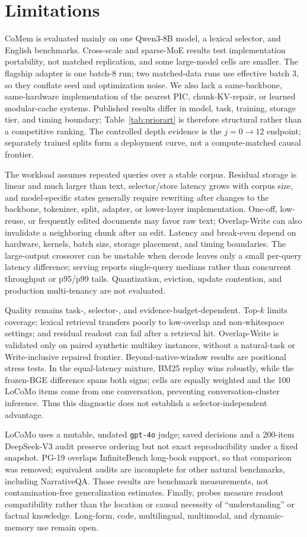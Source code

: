 \section*{Limitations}

CoMem is evaluated mainly on one Qwen3-8B model, a lexical selector, and English
benchmarks. Cross-scale and sparse-MoE results test implementation portability,
not matched replication, and some large-model cells are smaller. The flagship
adapter is one batch-8 run; two matched-data runs use effective batch 3, so they
conflate seed and optimization noise. We also lack a same-backbone,
same-hardware implementation of the nearest PIC, chunk-KV-repair, or learned
modular-cache systems. Published results differ in model, task, training,
storage tier, and timing boundary; Table~\ref{tab:priorart} is therefore
structural rather than a competitive ranking. The controlled depth evidence is
the $j{=}0\!\rightarrow\!12$ endpoint; separately trained splits form a
deployment curve, not a compute-matched causal frontier.

The workload assumes repeated queries over a stable corpus. Residual storage is
linear and much larger than text, selector/store latency grows with corpus size,
and model-specific states generally require rewriting after changes to the
backbone, tokenizer, split, adapter, or lower-layer implementation. One-off,
low-reuse, or frequently edited documents may favor raw text; Overlap-Write can
also invalidate a neighboring chunk after an edit. Latency and break-even depend
on hardware, kernels, batch size, storage placement, and timing boundaries. The
large-output crossover can be unstable when decode leaves only a small
per-query latency difference; serving reports single-query medians rather than
concurrent throughput or p95/p99 tails. Quantization,
eviction, update contention, and production multi-tenancy are not evaluated.

Quality remains task-, selector-, and evidence-budget-dependent. Top-$k$ limits
coverage; lexical retrieval transfers poorly to low-overlap and non-whitespace
settings; and residual readout can fail after a retrieval hit. Overlap-Write is
validated only on paired synthetic multikey instances, without a natural-task or
Write-inclusive repaired frontier. Beyond-native-window results are positional
stress tests. In the equal-latency mixture, BM25 replay wins robustly, while the
frozen-BGE difference spans both signs; cells are equally weighted and the 100
LoCoMo items come from one conversation, preventing conversation-cluster
inference. Thus this diagnostic does not establish a selector-independent
advantage.

LoCoMo uses a mutable, undated \texttt{gpt-4o} judge; saved decisions and a
200-item DeepSeek-V3 audit preserve ordering but not exact reproducibility under
a fixed snapshot. PG-19 overlaps InfiniteBench long-book support, so that
comparison was removed; equivalent audits are incomplete for other natural
benchmarks, including NarrativeQA. Those results are benchmark measurements,
not contamination-free generalization estimates. Finally, probes measure
readout compatibility rather than the location or causal necessity of
``understanding'' or factual knowledge. Long-form, code, multilingual,
multimodal, and dynamic-memory use remain open.
